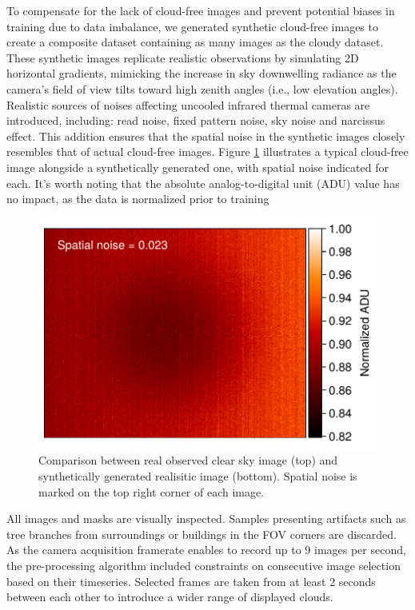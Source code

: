 \documentclass[amt, article]{copernicus}
\begin{document}
To compensate for the lack of cloud-free images and prevent potential biases in training due to data imbalance, we generated synthetic cloud-free images to create a composite dataset containing as many images as the cloudy dataset. These synthetic images replicate realistic observations by simulating 2D horizontal gradients, mimicking the increase in sky downwelling radiance as the camera's field of view tilts toward high zenith angles (i.e., low elevation angles). Realistic sources of noises affecting uncooled infrared thermal cameras are introduced, including: read noise, fixed pattern noise, sky noise and narcissus effect. This addition ensures that the spatial noise in the synthetic images closely resembles that of actual cloud-free images. Figure \ref{fig:synthetic_clear_sky_image} illustrates a typical cloud-free image alongside a synthetically generated one, with spatial noise indicated for each. It's worth noting that the absolute analog-to-digital unit (ADU) value has no impact, as the data is normalized prior to training

\begin{figure}[t]
	\includegraphics[width=\hsize]{figures/synthetic_clear_sky_image.pdf}
	\caption{Comparison between real observed clear sky image (top) and synthetically generated realisitic image (bottom). Spatial noise is marked on the top right corner of each image.}
    \label{fig:synthetic_clear_sky_image}
\end{figure}

All images and masks are visually inspected. Samples presenting artifacts such as tree branches from surroundings or buildings in the FOV corners are discarded. As the camera acquisition framerate enables to record up to 9 images per second, the pre-processing algorithm included constraints on consecutive image selection based on their timeseries. Selected frames are taken from at least 2 seconds between each other to introduce a wider range of displayed clouds.
\end{document}
